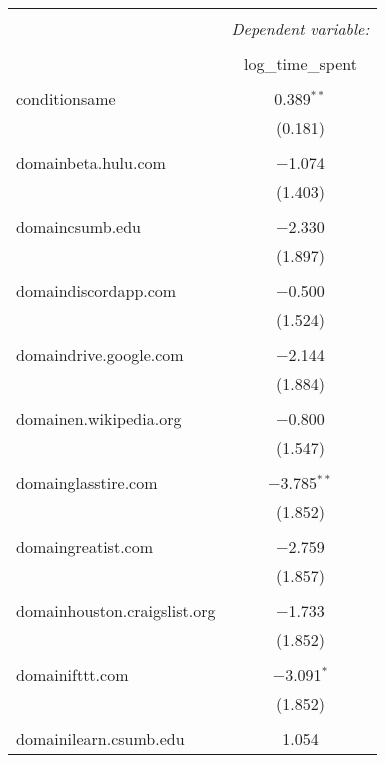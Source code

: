 \begin{table}[!htbp] \centering 
  \caption{} 
  \label{} 
\begin{tabular}{@{\extracolsep{5pt}}lc} 
\\[-1.8ex]\hline 
\hline \\[-1.8ex] 
 & \multicolumn{1}{c}{\textit{Dependent variable:}} \\ 
\cline{2-2} 
\\[-1.8ex] & log\_time\_spent \\ 
\hline \\[-1.8ex] 
 conditionsame & 0.389$^{**}$ \\ 
  & (0.181) \\ 
  & \\ 
 domainbeta.hulu.com & $-$1.074 \\ 
  & (1.403) \\ 
  & \\ 
 domaincsumb.edu & $-$2.330 \\ 
  & (1.897) \\ 
  & \\ 
 domaindiscordapp.com & $-$0.500 \\ 
  & (1.524) \\ 
  & \\ 
 domaindrive.google.com & $-$2.144 \\ 
  & (1.884) \\ 
  & \\ 
 domainen.wikipedia.org & $-$0.800 \\ 
  & (1.547) \\ 
  & \\ 
 domainglasstire.com & $-$3.785$^{**}$ \\ 
  & (1.852) \\ 
  & \\ 
 domaingreatist.com & $-$2.759 \\ 
  & (1.857) \\ 
  & \\ 
 domainhouston.craigslist.org & $-$1.733 \\ 
  & (1.852) \\ 
  & \\ 
 domainifttt.com & $-$3.091$^{*}$ \\ 
  & (1.852) \\ 
  & \\ 
 domainilearn.csumb.edu & 1.054 \\ 

\end{tabular}
\end{table}
